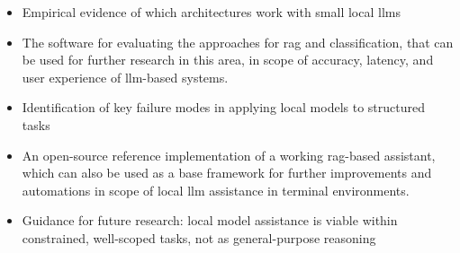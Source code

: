 \begin{itemize}
  \item Empirical evidence of which architectures work with small local \glspl{llm}
  \item The software for evaluating the approaches for \gls{rag} and
      classification, that can be used for further research in this area, in
      scope of accuracy, latency, and user experience of \gls{llm}-based
      systems.
  \item Identification of key failure modes in applying local models to structured tasks
  \item An open-source reference implementation of a working \gls{rag}-based
      assistant, which can also be used as a base framework for further
      improvements and automations in scope of local \gls{llm} assistance in
      terminal environments.
  \item Guidance for future research: local model assistance is viable within constrained,
      well-scoped tasks, not as general-purpose reasoning
\end{itemize}
